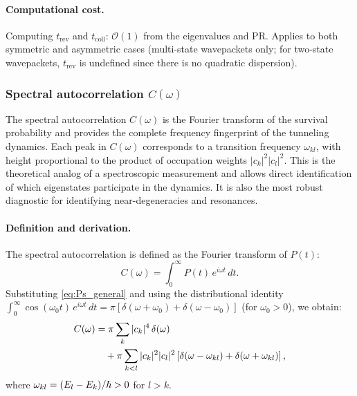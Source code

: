 \paragraph{Computational cost.}
Computing $t_{\text{rev}}$ and $t_{\text{coll}}$: $\mathcal{O}(1)$ from the eigenvalues and PR.
Applies to both symmetric and asymmetric cases (multi-state wavepackets only; for two-state wavepackets, $t_{\text{rev}}$ is undefined since there is no quadratic dispersion).

\subsubsection{Spectral autocorrelation $C(\omega)$}\label{sec:spectral_autocorr}

\begin{remark}
The spectral autocorrelation $C(\omega)$ is the Fourier transform of the survival probability and provides the complete frequency fingerprint of the tunneling dynamics.
Each peak in $C(\omega)$ corresponds to a transition frequency $\omega_{kl}$, with height proportional to the product of occupation weights $|c_k|^2|c_l|^2$.
This is the theoretical analog of a spectroscopic measurement and allows direct identification of which eigenstates participate in the dynamics.
It is also the most robust diagnostic for identifying near-degeneracies and resonances.
\end{remark}

\paragraph{Definition and derivation.}

The spectral autocorrelation is defined as the Fourier transform of $P(t)$:
\begin{equation}\label{eq:C_omega_def}
  C(\omega) = \int_0^{\infty} P(t)\,e^{i\omega t}\,dt.
\end{equation}
Substituting \cref{eq:Ps_general} and using the distributional identity $\int_0^\infty \cos(\omega_0 t)\,e^{i\omega t}\,dt = \pi[\delta(\omega + \omega_0) + \delta(\omega - \omega_0)]$ (for $\omega_0 > 0$), we obtain:
\begin{align}
  C(\omega) &= \pi\sum_k |c_k|^4\,\delta(\omega)\notag\\
  &\quad + \pi\sum_{k<l}|c_k|^2|c_l|^2\left[\delta(\omega - \omega_{kl}) + \delta(\omega + \omega_{kl})\right],
  \label{eq:C_omega}
\end{align}
where $\omega_{kl} = (E_l - E_k)/\hbar > 0$ for $l > k$.

